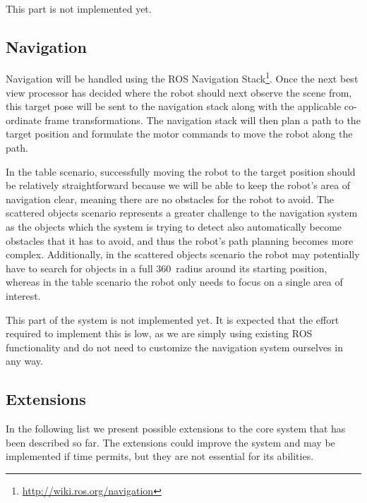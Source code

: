 \documentclass[a4paper,11pt,english]{article}
\begin{document}
\paragraph{}
This part is not implemented yet.

\subsection{Navigation}
\label{system:navigation}
Navigation will be handled using the ROS Navigation Stack\footnote{\url{http://wiki.ros.org/navigation}}.
Once the next best view processor has decided where the robot should next observe the scene from, this target pose will be sent to the navigation stack along with the applicable co-ordinate frame transformations.
The navigation stack will then plan a path to the target position and formulate the motor commands to move the robot along the path.

In the table scenario, successfully moving the robot to the target position should be relatively straightforward because we will be able to keep the robot's area of navigation clear, meaning there are no obstacles for the robot to avoid.
The scattered objects scenario represents a greater challenge to the navigation system as the objects which the system is trying to detect also automatically become obstacles that it has to avoid, and thus the robot's path planning becomes more complex.
Additionally, in the scattered objects scenario the robot may potentially have to search for objects in a full 360\degree\ radius around its starting position, whereas in the table scenario the robot only needs to focus on a single area of interest.

This part of the system is not implemented yet. It is expected that the effort required to implement this is low, as we are simply using existing ROS functionality and do not need to customize the navigation system ourselves in any way.

\subsection{Extensions}
\label{system:extensions}
In the following list we present possible extensions to the core system that has been described so far. 
The extensions could improve the system and may be implemented if time permits, but they are not essential for its abilities.
\end{document}
